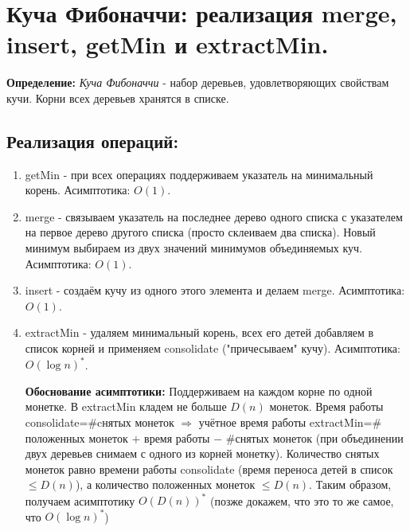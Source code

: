\setcounter{section}{34}
\section{Куча Фибоначчи: реализация merge, insert, getMin и extractMin.}
\par \textbf{Определение:} \textit{Куча Фибоначчи} - набор деревьев, удовлетворяющих свойствам кучи. Корни всех деревьев хранятся в списке.
\subsection*{Реализация операций:} \begin{enumerate}
    \item getMin - при всех операциях поддерживаем указатель на минимальный корень. Асимптотика: $O(1)$.
    \item merge - связываем указатель на последнее дерево одного списка с указателем на первое дерево другого списка (просто склеиваем два списка). Новый минимум выбираем из двух значений минимумов объединяемых куч. Асимптотика: $O(1)$.
    \item insert - создаём кучу из одного этого элемента и делаем merge. Асимптотика: $O(1)$.
    \item extractMin - удаляем минимальный корень, всех его детей добавляем в список корней и применяем consolidate ("причесываем" кучу). Асимптотика: $O(\log n)^*$.
    
\par \textbf{Обоснование асимптотики:} Поддерживаем на каждом корне по одной монетке. В extractMin кладем не больше $D(n)$ монеток. Время работы consolidate=$\#$cнятых монеток $\Rightarrow$ учётное время работы extractMin=$\#$положенных монеток $+$ время работы $-$ $\#$снятых монеток (при объединении двух деревьев снимаем с одного из корней монетку). Количество снятых монеток равно времени работы consolidate (время переноса детей в список $\leqslant D(n)$), а количество положенных монеток $\leqslant D(n)$. Таким образом, получаем асимптотику $O(D(n))^*$ (позже докажем, что это то же самое, что $O(\log n)^*$)
\end{enumerate}

\setcounter{section}{35}
